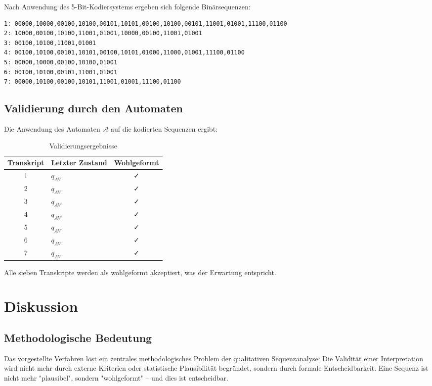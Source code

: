 \documentclass[
  12pt,
  a4paper,
  oneside,
  titlepage
]{article}
\begin{document}
Nach Anwendung des 5-Bit-Kodiersystems ergeben sich folgende 
Binärsequenzen:

\begin{lstlisting}[caption=Kodierte Terminalzeichenketten]
1: 00000,10000,00100,10100,00101,10101,00100,10100,00101,11001,01001,11100,01100
2: 10000,00100,10100,11001,01001,10000,00100,11001,01001
3: 00100,10100,11001,01001
4: 00100,10100,00101,10101,00100,10101,01000,11000,01001,11100,01100
5: 00000,10000,00100,10100,01001
6: 00100,10100,00101,11001,01001
7: 00000,10100,00100,10101,11001,01001,11100,01100
\end{lstlisting}

\subsection{Validierung durch den Automaten}

Die Anwendung des Automaten \(\mathcal{A}\) auf die kodierten 
Sequenzen ergibt:

\begin{table}[h]
\centering
\caption{Validierungsergebnisse}
\label{tab:validierung}
\begin{tabular}{@{} c l c @{}}
\toprule
\textbf{Transkript} & \textbf{Letzter Zustand} & \textbf{Wohlgeformt} \\
\midrule
1 & \(q_{AV}\) & ✓ \\
2 & \(q_{AV}\) & ✓ \\
3 & \(q_{AV}\) & ✓ \\
4 & \(q_{AV}\) & ✓ \\
5 & \(q_{AV}\) & ✓ \\
6 & \(q_{AV}\) & ✓ \\
7 & \(q_{AV}\) & ✓ \\
\bottomrule
\end{tabular}
\end{table}

Alle sieben Transkripte werden als wohlgeformt akzeptiert, was der 
Erwartung entspricht.

\section{Diskussion}

\subsection{Methodologische Bedeutung}

Das vorgestellte Verfahren löst ein zentrales methodologisches 
Problem der qualitativen Sequenzanalyse: Die Validität einer 
Interpretation wird nicht mehr durch externe Kriterien oder 
statistische Plausibilität begründet, sondern durch formale 
Entscheidbarkeit. Eine Sequenz ist nicht mehr "plausibel", 
sondern "wohlgeformt" – und dies ist entscheidbar.
\end{document}
